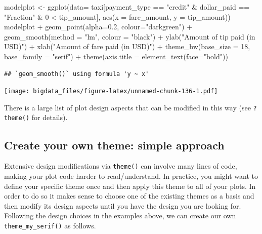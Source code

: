 \documentclass[
  12pt,
]{style/krantz}
\newenvironment{Shaded}{\begin{snugshade}}{\end{snugshade}}
\newcommand{\AttributeTok}[1]{\textcolor[rgb]{0.77,0.63,0.00}{#1}}
\newcommand{\DecValTok}[1]{\textcolor[rgb]{0.00,0.00,0.81}{#1}}
\newcommand{\FloatTok}[1]{\textcolor[rgb]{0.00,0.00,0.81}{#1}}
\newcommand{\FunctionTok}[1]{\textcolor[rgb]{0.00,0.00,0.00}{#1}}
\newcommand{\NormalTok}[1]{#1}
\newcommand{\OtherTok}[1]{\textcolor[rgb]{0.56,0.35,0.01}{#1}}
\newcommand{\SpecialCharTok}[1]{\textcolor[rgb]{0.00,0.00,0.00}{#1}}
\newcommand{\StringTok}[1]{\textcolor[rgb]{0.31,0.60,0.02}{#1}}
\begin{document}
\begin{Shaded}
\begin{Highlighting}[]
\NormalTok{modelplot }\OtherTok{\textless{}{-}} \FunctionTok{ggplot}\NormalTok{(}\AttributeTok{data=}\NormalTok{ taxi[payment\_type }\SpecialCharTok{==} \StringTok{"credit"} \SpecialCharTok{\&}\NormalTok{ dollar\_paid }\SpecialCharTok{==} \StringTok{"Fraction"} \SpecialCharTok{\&} \DecValTok{0} \SpecialCharTok{\textless{}}\NormalTok{ tip\_amount],}
                    \FunctionTok{aes}\NormalTok{(}\AttributeTok{x =}\NormalTok{ fare\_amount, }\AttributeTok{y =}\NormalTok{ tip\_amount))}
\NormalTok{modelplot }\SpecialCharTok{+}
     \FunctionTok{geom\_point}\NormalTok{(}\AttributeTok{alpha=}\FloatTok{0.2}\NormalTok{, }\AttributeTok{colour=}\StringTok{"darkgreen"}\NormalTok{) }\SpecialCharTok{+}
     \FunctionTok{geom\_smooth}\NormalTok{(}\AttributeTok{method =} \StringTok{"lm"}\NormalTok{, }\AttributeTok{colour =} \StringTok{"black"}\NormalTok{) }\SpecialCharTok{+}
     \FunctionTok{ylab}\NormalTok{(}\StringTok{"Amount of tip paid (in USD)"}\NormalTok{) }\SpecialCharTok{+}
     \FunctionTok{xlab}\NormalTok{(}\StringTok{"Amount of fare paid (in USD)"}\NormalTok{) }\SpecialCharTok{+}
     \FunctionTok{theme\_bw}\NormalTok{(}\AttributeTok{base\_size =} \DecValTok{18}\NormalTok{, }\AttributeTok{base\_family =} \StringTok{"serif"}\NormalTok{) }\SpecialCharTok{+}
     \FunctionTok{theme}\NormalTok{(}\AttributeTok{axis.title =} \FunctionTok{element\_text}\NormalTok{(}\AttributeTok{face=}\StringTok{"bold"}\NormalTok{))}
\end{Highlighting}
\end{Shaded}

\begin{verbatim}
## `geom_smooth()` using formula 'y ~ x'
\end{verbatim}

\texttt{[image: bigdata\_files/figure-latex/unnamed-chunk-136-1.pdf]}

There is a large list of plot design aspects that can be modified in this way (see \texttt{?theme()} for details).

\hypertarget{create-your-own-theme-simple-approach}{%
\subsection{Create your own theme: simple approach}\label{create-your-own-theme-simple-approach}}

Extensive design modifications via \texttt{theme()} can involve many lines of code, making your plot code harder to read/understand. In practice, you might want to define your specific theme once and then apply this theme to all of your plots. In order to do so it makes sense to choose one of the existing themes as a basis and then modify its design aspects until you have the design you are looking for. Following the design choices in the examples above, we can create our own \texttt{theme\_my\_serif()} as follows.
\end{document}
